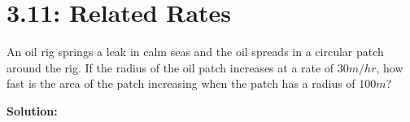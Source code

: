 \documentclass[mathNotesPreamble]{subfiles}
\begin{document}
\section{3.11: Related Rates}

\begin{ex*}
  An oil rig springs a leak in calm seas and the oil spreads in a circular patch around the rig. If the radius of the oil patch increases at a rate of $30m/hr$, how fast is the area of the patch increasing when the patch has a radius of $100 m$?
\end{ex*}
\noindent
\textbf{Solution:}
\end{document}
